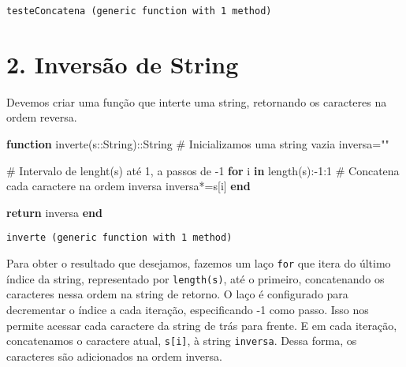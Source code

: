 \documentclass[
  letterpaper,
  DIV=11,
  numbers=noendperiod]{scrreprt}
\newenvironment{Shaded}{\begin{snugshade}}{\end{snugshade}}
\newcommand{\CommentTok}[1]{\textcolor[rgb]{0.37,0.37,0.37}{#1}}
\newcommand{\ControlFlowTok}[1]{\textcolor[rgb]{0.00,0.23,0.31}{\textbf{#1}}}
\newcommand{\DataTypeTok}[1]{\textcolor[rgb]{0.68,0.00,0.00}{#1}}
\newcommand{\FloatTok}[1]{\textcolor[rgb]{0.68,0.00,0.00}{#1}}
\newcommand{\FunctionTok}[1]{\textcolor[rgb]{0.28,0.35,0.67}{#1}}
\newcommand{\KeywordTok}[1]{\textcolor[rgb]{0.00,0.23,0.31}{\textbf{#1}}}
\newcommand{\NormalTok}[1]{\textcolor[rgb]{0.00,0.23,0.31}{#1}}
\newcommand{\OperatorTok}[1]{\textcolor[rgb]{0.37,0.37,0.37}{#1}}
\newcommand{\StringTok}[1]{\textcolor[rgb]{0.13,0.47,0.30}{#1}}
\begin{document}
\begin{verbatim}
testeConcatena (generic function with 1 method)
\end{verbatim}

\section{2. Inversão de String}\label{inversuxe3o-de-string}

Devemos criar uma função que interte uma string, retornando os
caracteres na ordem reversa.

\begin{Shaded}
\begin{Highlighting}[]
\KeywordTok{function} \FunctionTok{inverte}\NormalTok{(s}\OperatorTok{::}\DataTypeTok{String}\NormalTok{)}\OperatorTok{::}\DataTypeTok{String}
    \CommentTok{\# Inicializamos uma string vazia}
\NormalTok{    inversa}\OperatorTok{=}\StringTok{""}

    \CommentTok{\# Intervalo de lenght(s) até 1, a passos de {-}1}
    \ControlFlowTok{for}\NormalTok{ i }\KeywordTok{in} \FunctionTok{length}\NormalTok{(s)}\OperatorTok{:{-}}\FloatTok{1}\OperatorTok{:}\FloatTok{1}
        \CommentTok{\# Concatena cada caractere na ordem inversa}
\NormalTok{        inversa}\OperatorTok{*=}\NormalTok{s[i]}
    \ControlFlowTok{end}

    \ControlFlowTok{return}\NormalTok{ inversa}
\KeywordTok{end}
\end{Highlighting}
\end{Shaded}

\begin{verbatim}
inverte (generic function with 1 method)
\end{verbatim}

Para obter o resultado que desejamos, fazemos um laço \texttt{for} que
itera do último índice da string, representado por \texttt{length(s)},
até o primeiro, concatenando os caracteres nessa ordem na string de
retorno. O laço é configurado para decrementar o índice a cada iteração,
especificando -1 como passo. Isso nos permite acessar cada caractere da
string de trás para frente. E em cada iteração, concatenamos o caractere
atual, \texttt{s{[}i{]}}, à string \texttt{inversa}. Dessa forma, os
caracteres são adicionados na ordem inversa.
\end{document}

